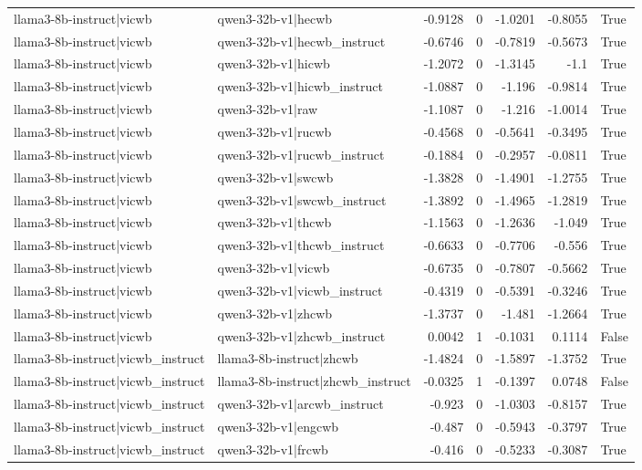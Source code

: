 \begin{table}
\begin{tabular}{l l r r r r l}
llama3-8b-instruct|vicwb & qwen3-32b-v1|hecwb & -0.9128 & 0 & -1.0201 & -0.8055 & True \\
llama3-8b-instruct|vicwb & qwen3-32b-v1|hecwb_instruct & -0.6746 & 0 & -0.7819 & -0.5673 & True \\
llama3-8b-instruct|vicwb & qwen3-32b-v1|hicwb & -1.2072 & 0 & -1.3145 & -1.1 & True \\
llama3-8b-instruct|vicwb & qwen3-32b-v1|hicwb_instruct & -1.0887 & 0 & -1.196 & -0.9814 & True \\
llama3-8b-instruct|vicwb & qwen3-32b-v1|raw & -1.1087 & 0 & -1.216 & -1.0014 & True \\
llama3-8b-instruct|vicwb & qwen3-32b-v1|rucwb & -0.4568 & 0 & -0.5641 & -0.3495 & True \\
llama3-8b-instruct|vicwb & qwen3-32b-v1|rucwb_instruct & -0.1884 & 0 & -0.2957 & -0.0811 & True \\
llama3-8b-instruct|vicwb & qwen3-32b-v1|swcwb & -1.3828 & 0 & -1.4901 & -1.2755 & True \\
llama3-8b-instruct|vicwb & qwen3-32b-v1|swcwb_instruct & -1.3892 & 0 & -1.4965 & -1.2819 & True \\
llama3-8b-instruct|vicwb & qwen3-32b-v1|thcwb & -1.1563 & 0 & -1.2636 & -1.049 & True \\
llama3-8b-instruct|vicwb & qwen3-32b-v1|thcwb_instruct & -0.6633 & 0 & -0.7706 & -0.556 & True \\
llama3-8b-instruct|vicwb & qwen3-32b-v1|vicwb & -0.6735 & 0 & -0.7807 & -0.5662 & True \\
llama3-8b-instruct|vicwb & qwen3-32b-v1|vicwb_instruct & -0.4319 & 0 & -0.5391 & -0.3246 & True \\
llama3-8b-instruct|vicwb & qwen3-32b-v1|zhcwb & -1.3737 & 0 & -1.481 & -1.2664 & True \\
llama3-8b-instruct|vicwb & qwen3-32b-v1|zhcwb_instruct & 0.0042 & 1 & -0.1031 & 0.1114 & False \\
llama3-8b-instruct|vicwb_instruct & llama3-8b-instruct|zhcwb & -1.4824 & 0 & -1.5897 & -1.3752 & True \\
llama3-8b-instruct|vicwb_instruct & llama3-8b-instruct|zhcwb_instruct & -0.0325 & 1 & -0.1397 & 0.0748 & False \\
llama3-8b-instruct|vicwb_instruct & qwen3-32b-v1|arcwb_instruct & -0.923 & 0 & -1.0303 & -0.8157 & True \\
llama3-8b-instruct|vicwb_instruct & qwen3-32b-v1|engcwb & -0.487 & 0 & -0.5943 & -0.3797 & True \\
llama3-8b-instruct|vicwb_instruct & qwen3-32b-v1|frcwb & -0.416 & 0 & -0.5233 & -0.3087 & True \\

\end{tabular}
\end{table}
